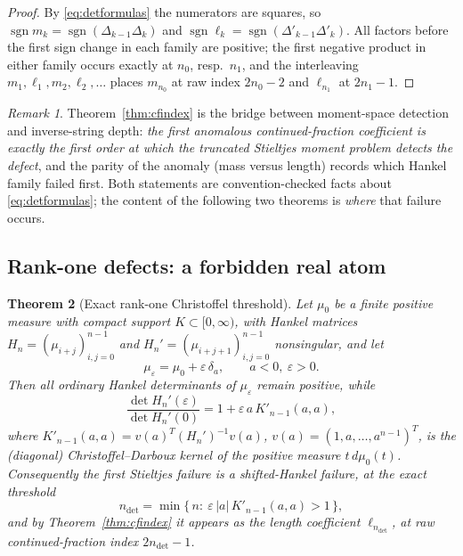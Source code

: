 \documentclass[11pt]{amsart}
\newtheorem{theorem}{Theorem}[section]
\theoremstyle{definition}
\theoremstyle{remark}
\newtheorem{remark}[theorem]{Remark}
\newcommand{\dd}{\,d}
\newcommand{\eps}{\varepsilon}
\DeclareMathOperator{\sgn}{sgn}
\begin{document}
\begin{proof}
By \eqref{eq:detformulas} the numerators are squares, so
$\sgn m_k=\sgn(\Delta_{k-1}\Delta_k)$ and
$\sgn\ell_k=\sgn(\Delta'_{k-1}\Delta'_k)$. All factors before the first sign
change in each family are positive; the first negative product in either
family occurs exactly at $n_0$, resp.\ $n_1$, and the interleaving
$m_1,\ell_1,m_2,\ell_2,\dots$ places $m_{n_0}$ at raw index $2n_0-2$ and
$\ell_{n_1}$ at $2n_1-1$.
\end{proof}

\begin{remark}
Theorem~\ref{thm:cfindex} is the bridge between moment-space detection and
inverse-string depth: \emph{the first anomalous continued-fraction
coefficient is exactly the first order at which the truncated Stieltjes
moment problem detects the defect}, and the parity of the anomaly (mass
versus length) records which Hankel family failed first. Both statements are
convention-checked facts about \eqref{eq:detformulas}; the content of the
following two theorems is \emph{where} that failure occurs.
\end{remark}

\subsection{Rank-one defects: a forbidden real atom}

\begin{theorem}[Exact rank-one Christoffel threshold]\label{thm:rankone}
Let $\mu_0$ be a finite positive measure with compact support
$K\subset[0,\infty)$, with Hankel matrices $H_n=(\mu_{i+j})_{i,j=0}^{n-1}$
and $H_n'=(\mu_{i+j+1})_{i,j=0}^{n-1}$ nonsingular, and let
\[
\mu_\eps=\mu_0+\eps\,\delta_a,\qquad a<0,\ \eps>0 .
\]
Then all ordinary Hankel determinants of $\mu_\eps$ remain positive, while
\begin{equation}\label{eq:rankone}
\frac{\det H_n'(\eps)}{\det H_n'(0)}
=1+\eps\,a\,K'_{n-1}(a,a),
\end{equation}
where $K'_{n-1}(a,a)=v(a)^{T}(H_n')^{-1}v(a)$,
$v(a)=(1,a,\dots,a^{n-1})^{T}$, is the (diagonal) Christoffel--Darboux kernel
of the positive measure $t\dd\mu_0(t)$. Consequently the first Stieltjes
failure is a shifted-Hankel failure, at the exact threshold
\begin{equation}\label{eq:threshold}
n_{\det}=\min\{\,n:\ \eps\,|a|\,K'_{n-1}(a,a)>1\,\},
\end{equation}
and by Theorem~\ref{thm:cfindex} it appears as the length coefficient
$\ell_{n_{\det}}$, at raw continued-fraction index $2n_{\det}-1$.
\end{theorem}
\end{document}

